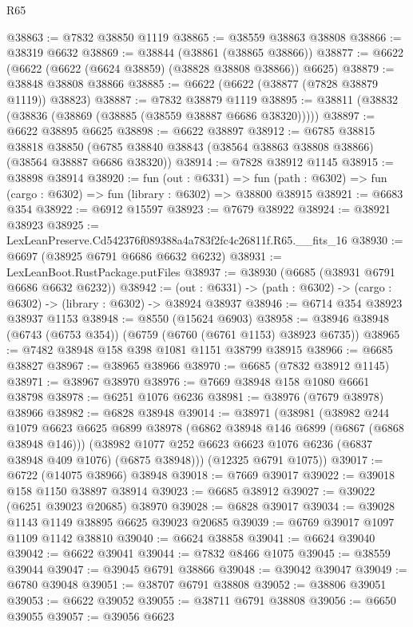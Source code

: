 \begin{lexlean}{R65}
\begin{coremodule}
{@38863 := @7832 @38850 @1119
@38865 := @38559 @38863 @38808
@38866 := @38319 @6632
@38869 := @38844 (@38861 (@38865 @38866))
@38877 := @6622 (@6622 (@6622 (@6624 @38859) (@38828 @38808 @38866)) @6625)
@38879 := @38848 @38808 @38866
@38885 := @6622 (@6622 (@38877 (@7828 @38879 @1119)) @38823)
@38887 := @7832 @38879 @1119
@38895 := @38811 (@38832 (@38836 (@38869 (@38885 (@38559 @38887 @6686 @38320)))))
@38897 := @6622 @38895 @6625
@38898 := @6622 @38897
@38912 := @6785
    @38815
    @38818
    @38850
    (@6785 @38840 @38843 (@38564 @38863 @38808 @38866) (@38564 @38887 @6686 @38320))
@38914 := @7828 @38912 @1145
@38915 := @38898 @38914
@38920 := fun (out : @6331) =>
  fun (path : @6302) => fun (cargo : @6302) => fun (library : @6302) => @38800 @38915
@38921 := @6683 @354
@38922 := @6912 @15597
@38923 := @7679 @38922
@38924 := @38921 @38923
@38925 := LexLeanPreserve.Cd542376f089388a4a783f2fc4c26811f.R65.__fits_16
@38930 := @6697 (@38925 @6791 @6686 @6632 @6232)
@38931 := LexLeanBoot.RustPackage.putFiles
@38937 := @38930 (@6685 (@38931 @6791 @6686 @6632 @6232))
@38942 := (out : @6331) -> (path : @6302) -> (cargo : @6302) -> (library : @6302) -> @38924 @38937
@38946 := @6714 @354 @38923 @38937 @1153
@38948 := @8550 (@15624 @6903)
@38958 := @38946 @38948 (@6743 (@6753 @354)) (@6759 (@6760 (@6761 @1153) @38923 @6735))
@38965 := @7482 @38948 @158 @398 @1081 @1151 @38799 @38915
@38966 := @6685 @38827
@38967 := @38965 @38966
@38970 := @6685 (@7832 @38912 @1145)
@38971 := @38967 @38970
@38976 := @7669 @38948 @158 @1080 @6661 @38798
@38978 := @6251 @1076 @6236
@38981 := @38976 (@7679 @38978) @38966
@38982 := @6828 @38948
@39014 := @38971
    (@38981
      (@38982
        @244
        @1079
        @6623
        @6625
        @6899
        @38978
        (@6862 @38948 @146 @6899 (@6867 (@6868 @38948 @146)))
        (@38982 @1077 @252 @6623 @6623 @1076 @6236 (@6837 @38948 @409 @1076) (@6875 @38948)))
      (@12325 @6791 @1075))
@39017 := @6722 (@14075 @38966) @38948
@39018 := @7669 @39017
@39022 := @39018 @158 @1150 @38897 @38914
@39023 := @6685 @38912
@39027 := @39022 (@6251 @39023 @20685) @38970
@39028 := @6828 @39017
@39034 := @39028 @1143 @1149 @38895 @6625 @39023 @20685
@39039 := @6769 @39017 @1097 @1109 @1142 @38810
@39040 := @6624 @38858
@39041 := @6624 @39040
@39042 := @6622 @39041
@39044 := @7832 @8466 @1075
@39045 := @38559 @39044
@39047 := @39045 @6791 @38866
@39048 := @39042 @39047
@39049 := @6780 @39048
@39051 := @38707 @6791 @38808
@39052 := @38806 @39051
@39053 := @6622 @39052
@39055 := @38711 @6791 @38808
@39056 := @6650 @39055
@39057 := @39056 @6623
}
\end{coremodule}
\end{lexlean}
